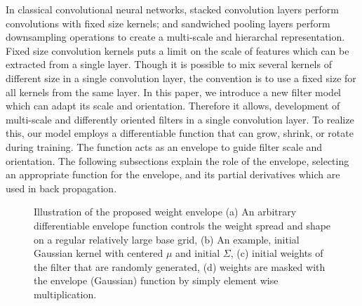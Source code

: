 \documentclass{bmvc2k}
\begin{document}
\label{sec:methods}
In classical convolutional neural networks, stacked convolution layers perform convolutions with fixed size kernels; and sandwiched pooling layers perform downsampling operations to create a multi-scale and hierarchal representation. Fixed size convolution kernels puts a limit on the scale of features which can be extracted from a single layer. Though it is possible to mix several kernels of different size in a single convolution layer, the convention is to use a fixed size for all kernels from the same layer. In this paper, we introduce a new filter model which can adapt its scale and orientation. Therefore it allows, development of multi-scale and differently oriented filters in a single convolution layer. To realize this, our model employs a differentiable function that can grow, shrink, or rotate during training. The function acts as an envelope to guide filter scale and orientation. The following subsections explain the role of the envelope, selecting an appropriate function for the envelope, and its partial derivatives which are used in back propagation.




%
\begin{figure}
	\centering     %
	
	
	\caption{Illustration of the proposed weight envelope (a) An arbitrary differentiable  envelope function controls the weight spread and shape on a regular relatively large base grid, (b) An example, initial Gaussian kernel with centered $\mu$ and initial $\Sigma$, (c) initial weights of the filter that are randomly generated, (d) weights are masked with the envelope (Gaussian) function by simply element wise multiplication.}
	\label{fig1}
\end{figure}
\end{document}
